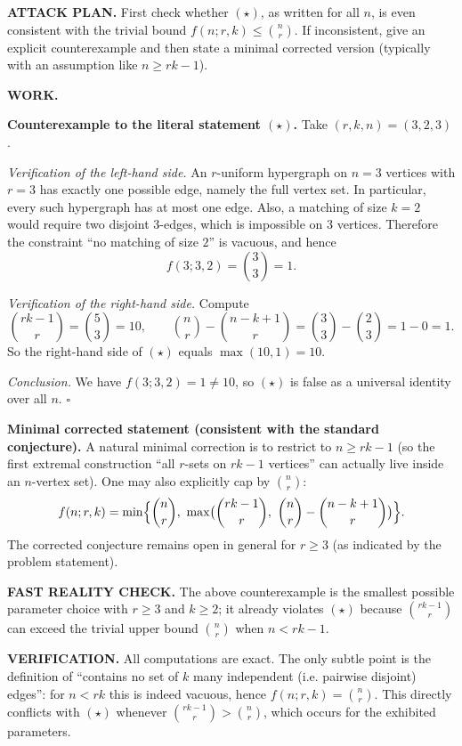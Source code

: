\medskip
\noindent\textbf{ATTACK PLAN.}
First check whether $(\star)$, as written for all $n$, is even consistent with the trivial bound $f(n;r,k)\le \binom{n}{r}$.
If inconsistent, give an explicit counterexample and then state a minimal corrected version (typically with an assumption like $n\ge rk-1$).

\medskip
\noindent\textbf{WORK.}

\noindent\textbf{Counterexample to the literal statement $(\star)$.}
Take $(r,k,n)=(3,2,3)$.

\textit{Verification of the left-hand side.}
An $r$-uniform hypergraph on $n=3$ vertices with $r=3$ has exactly one possible edge, namely the full vertex set.
In particular, every such hypergraph has at most one edge.
Also, a matching of size $k=2$ would require two disjoint $3$-edges, which is impossible on $3$ vertices.
Therefore the constraint “no matching of size $2$” is vacuous, and hence
\[
f(3;3,2)=\binom{3}{3}=1.
\]

\textit{Verification of the right-hand side.}
Compute
\[
\binom{rk-1}{r}=\binom{5}{3}=10,
\qquad
\binom{n}{r}-\binom{n-k+1}{r}=\binom{3}{3}-\binom{2}{3}=1-0=1.
\]
So the right-hand side of $(\star)$ equals $\max(10,1)=10$.

\textit{Conclusion.}
We have $f(3;3,2)=1\ne 10$, so $(\star)$ is false as a universal identity over all $n$.
\hfill$\square$

\medskip
\noindent\textbf{Minimal corrected statement (consistent with the standard conjecture).}
A natural minimal correction is to restrict to $n\ge rk-1$ (so the first extremal construction “all $r$-sets on $rk-1$ vertices” can actually live inside an $n$-vertex set). One may also explicitly cap by $\binom{n}{r}$:
\[
 f(n;r,k)=\min\Bigl\{\binom{n}{r},\ \max\bigl(\binom{rk-1}{r},\ \binom{n}{r}-\binom{n-k+1}{r}\bigr)\Bigr\}.
\]
The corrected conjecture remains open in general for $r\ge 3$ (as indicated by the problem statement).

\medskip
\noindent\textbf{FAST REALITY CHECK.}
The above counterexample is the smallest possible parameter choice with $r\ge 3$ and $k\ge 2$; it already violates $(\star)$ because $\binom{rk-1}{r}$ can exceed the trivial upper bound $\binom{n}{r}$ when $n<rk-1$.

\medskip
\noindent\textbf{VERIFICATION.}
All computations are exact.
The only subtle point is the definition of “contains no set of $k$ many independent (i.e. pairwise disjoint) edges”: for $n<rk$ this is indeed vacuous, hence $f(n;r,k)=\binom{n}{r}$.
This directly conflicts with $(\star)$ whenever $\binom{rk-1}{r}>\binom{n}{r}$, which occurs for the exhibited parameters.

